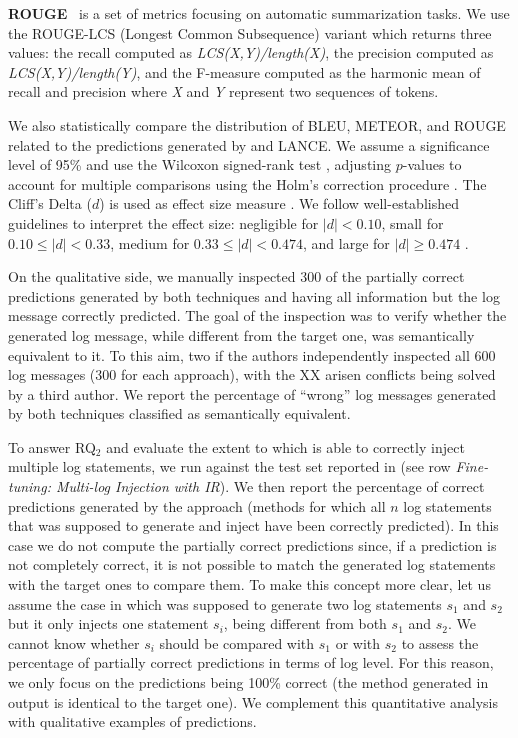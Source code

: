 \textbf{ROUGE}~\cite{lin2004rouge} is a set of metrics focusing on automatic summarization tasks. We use the ROUGE-LCS (Longest Common Subsequence) variant which returns three values: the recall computed as \textit{LCS(X,Y)/length(X)}, the precision computed as \textit{LCS(X,Y)/length(Y)}, and the F-measure computed as the harmonic mean of recall and precision where \textit{X} and \textit{Y} represent two sequences of tokens.

We also statistically compare the distribution of BLEU, METEOR, and ROUGE related to the predictions generated by \approach and LANCE. We assume a significance level of 95\% and use the Wilcoxon signed-rank test \cite{wilcoxon}, adjusting $p$-values to account for multiple comparisons using the Holm's correction procedure \cite{Holm1979a}. The  Cliff's Delta ($d$) is used as effect size measure \cite{Gris2005a}. We follow well-established guidelines to interpret the effect size: negligible for $|d| < 0.10$, small for $0.10 \le |d| < 0.33$, medium for $0.33 \le |d| < 0.474$, and large for $|d| \ge 0.474$ \cite{Gris2005a}.

On the qualitative side, we manually inspected 300 of the partially correct predictions generated by both techniques and having all information but the log message correctly predicted. The goal of the inspection was to verify whether the generated log message, while different from the target one, was semantically equivalent to it. To this aim, two if the authors independently inspected all 600 log messages (300 for each approach), with the XX arisen conflicts being solved by a third author. We report the percentage of ``wrong'' log messages generated by both techniques classified as semantically equivalent.

To answer RQ$_2$ and evaluate the extent to which \approach is able to correctly inject multiple log statements, we run \approach against the test set reported in  (see row \emph{Fine-tuning: Multi-log Injection with IR}). We then report the percentage of correct predictions generated by the approach (\ie methods for which all $n$ log statements that \approach was supposed to generate and inject have been correctly predicted). In this case we do not compute the partially correct predictions since, if a prediction is not completely correct, it is not possible to match the generated log statements with the target ones to compare them. To make this concept more clear, let us assume the case in which \approach was supposed to generate two log statements $s_1$ and $s_2$ but it only injects one statement $s_i$, being different from both $s_1$ and $s_2$. We cannot know whether $s_i$ should be compared with $s_1$ or with $s_2$ to assess the percentage of partially correct predictions in terms of \eg log level. For this reason, we only focus on the predictions being 100\% correct (\ie the method generated in output is identical to the target one). We complement this quantitative analysis with qualitative examples of predictions.

